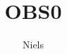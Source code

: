 \documentclass[a4paper,11pt]{article}
\title{OBS0}
\author{Niels}
\begin{document}
\maketitle

\begin{sketch}

\end{sketch}
\end{document}
